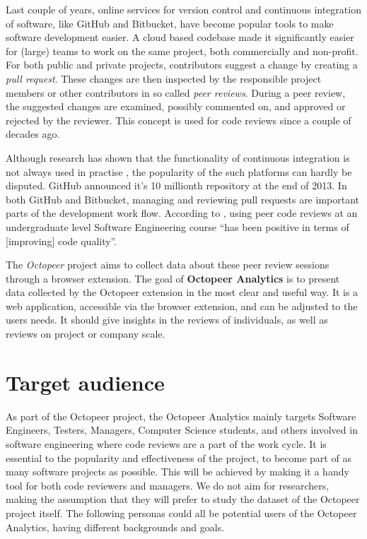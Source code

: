 \documentclass{article}
\begin{document}
Last couple of years, online services for version control and continuous integration of software, like GitHub and Bitbucket, have become popular tools to make software development easier. A cloud based codebase made it significantly easier for (large) teams to work on the same project, both commercially and non-profit. For both public and private projects, contributors suggest a change by creating a \textit{pull request}. These changes are then inspected by the responsible project members or other contributors in so called \textit{peer reviews}. During a peer review, the suggested changes are examined, possibly commented on, and approved or rejected by the reviewer. This concept is used for code reviews since a couple of decades ago. \parencite{softwareinspections}

Although research has shown that the functionality of continuous integration is not always used in practise \parencite{contin}, the popularity of the such platforms can hardly be disputed. GitHub announced it's 10 millionth repository at the end of 2013. \parencite{githubblog} In both GitHub and Bitbucket, managing and reviewing pull requests are important parts of the development work flow. According to \cite{insupportofpeercodereview}, using peer code reviews at an undergraduate level Software Engineering course ``has been positive in terms of [improving] code quality''.


The \textit{Octopeer} project aims to collect data about these peer review sessions through a browser extension. The goal of \textbf{Octopeer Analytics} is to present data collected by the Octopeer extension in the most clear and useful way. It is a web application, accessible via the browser extension, and can be adjusted to the users needs. It should give insights in the reviews of individuals, as well as reviews on project or company scale.


\section{Target audience} \label{section:targetaudience}
As part of the Octopeer project, the Octopeer Analytics mainly targets Software Engineers, Testers, Managers, Computer Science students, and others involved in software engineering where code reviews are a part of the work cycle. It is essential to the popularity and effectiveness of the project, to become part of as many software projects as possible. This will be achieved by making it a handy tool for both code reviewers and managers. We do not aim for researchers, making the assumption that they will prefer to study the dataset of the Octopeer project itself. The following personas could all be potential users of the Octopeer Analytics, having different backgrounds and goals.
\end{document}
